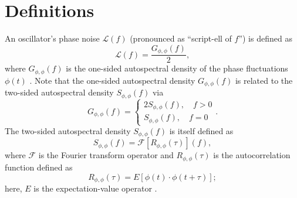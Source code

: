 \section{Definitions}
An oscillator's phase noise $\mathcal{L}(f)$
(pronounced as ``script-ell of $f$'')
is defined as
\begin{equation}
  \mathcal{L}(f)
  =
  \frac{G_{\phi,\phi}(f)}{2},
  \label{eq:OscillatorPhaseNoise:oscillator_phase_noise}
\end{equation}
where $G_{\phi,\phi}(f)$ is
the one-sided autospectral density of the phase fluctuations $\phi(t)$
\cite{ieee_std1139}.
Note that the one-sided autospectral density $G_{\phi,\phi}(f)$
is related to the two-sided autospectral density $S_{\phi,\phi}(f)$ via
\begin{equation}
  G_{\phi, \phi}(f)
  =
  \begin{cases}
    2 S_{\phi, \phi}(f), \quad f > 0
    \\
    S_{\phi, \phi}(f), \quad f = 0
  \end{cases}.
\end{equation}
The two-sided autospectral density $S_{\phi,\phi}(f)$ is itself defined as
\begin{equation}
  S_{\phi,\phi}(f)
  =
  \mathcal{F}\left[ R_{\phi,\phi}(\tau) \right](f),
\end{equation}
where $\mathcal{F}$ is the Fourier transform operator and
$R_{\phi,\phi}(\tau)$ is the autocorrelation function defined as
\begin{equation}
  R_{\phi,\phi}(\tau)
  =
  E\left[ \phi(t) \cdot \phi(t + \tau) \right];
\end{equation}
here, $E$ is the expectation-value operator
\cite[Ch.~5]{bendat_and_piersol}.


